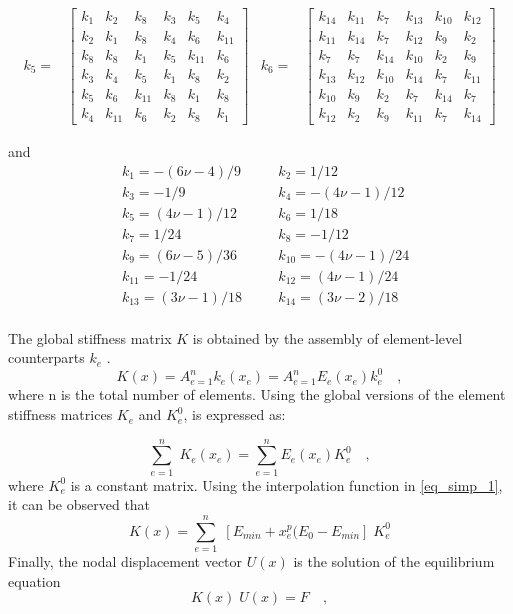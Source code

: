 \begin{align*}
k_5 =& \begin{bmatrix}
k_1 & k_2 & k_8 & k_3 & k_5 & k_4 \\ 
k_2 & k_1 & k_8 & k_4 & k_6 & k_{11} \\ 
k_8 & k_8 & k_1 & k_5 & k_{11} & k_6 \\ 
k_3 & k_4 & k_5 & k_1 & k_8 & k_2 \\ 
k_5 & k_6 & k_{11} & k_8 & k_1 & k_8 \\ 
k_4 & k_{11} & k_6 & k_2 & k_8 & k_1
\end{bmatrix}
&k_6 =& \begin{bmatrix}
k_{14} & k_{11} & k_7 & k_{13} & k_{10} & k_{12} \\ 
k_{11} & k_{14} & k_7 & k_{12} & k_9 & k_2 \\ 
k_7 & k_7 & k_{14} & k_{10} & k_2 & k_9 \\ 
k_{13} & k_{12} & k_{10} & k_{14} & k_7 & k_{11} \\ 
k_{10} & k_9 & k_2 & k_7 & k_{14} & k_7 \\ 
k_{12} & k_2 & k_9 & k_{11} & k_7 & k_{14}
\end{bmatrix} 
\end{align*}
\endgroup
 
and
\begin{align*}
&k_1 = -(6\nu-4)/9 \quad && k_2 = 1/12\\
&k_3 = -1/9 \quad && k_4 = -(4\nu-1)/12\\
&k_5 = (4\nu-1)/12 \quad && k_6 = 1/18\\
&k_7 = 1/24 \quad && k_8 = -1/12\\
&k_9 = (6\nu-5)/36 \quad &&k_{10} = -(4\nu - 1)/24\\
&k_{11} = -1/24 \quad &&k_{12} = (4\nu -1)/24\\
&k_{13} = (3\nu -1)/18 \quad &&k_{14} = (3\nu -2)/18\\
\end{align*}

The global stiffness matrix \textbf{$K$} is obtained by the assembly of element-level counterparts $k_e$ \cite{Liu.2014}.
$$K(x) = A_{e=1}^nk_e(x_e) = A_{e=1}^nE_e(x_e)k_e^0 \quad,$$
where n is the total number of elements. Using the global versions of the element stiffness matrices \textbf{$K_e$} and \textbf{$K_e^0$}, is expressed as:

$$\sum_{e=1}^n \; K_e(x_e) = \sum_{e=1}^nE_e(x_e)K_e^0 \quad,$$
where \textbf{$K_e^0$} is a constant matrix. Using the interpolation function in \eqref{eq_simp_1}, it can be observed that
$$K(x) = \sum_{e=1}^n  \; [E_{min}+x_e^p(E_0 -E_{min}] \; K_e^0$$
Finally, the nodal displacement vector \textbf{$U(x)$} is the solution of the equilibrium equation \cite{Liu.2014}\\
$$K(x)\;U(x) = F \quad,$$

